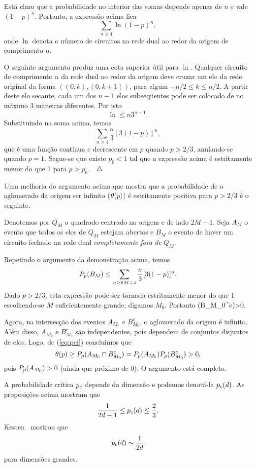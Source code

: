 Está claro que a probabilidade no interior das somas depende apenas de $n$ e vale
$(1-p)^n$. Portanto, a expressão acima fica
$$
\sum_{n\geq4}\ln(1-p)^n,
$$
onde $\ln$ denota o número de circuitos na rede dual ao redor da origem de 
comprimento $n$.

O seguinte argumento produz uma cota superior útil para $\ln$. Qualquer circuito
de comprimento $n$ da rede dual ao redor da origem deve cruzar um elo da rede
original da forma $((0,k),(0,k+1))$, para algum $-n/2\leq k\leq n/2$. A partir deste
elo secante, cada um dos $n-1$ elos subseqüentes pode ser colocado de no máximo 
$3$ maneiras diferentes. Por isto
$$\ln\leq n3^{n-1}.$$
Substituindo na soma acima, temos
$$
\sum_{n\geq4}\frac{n}{3}[3(1-p)]^n,
$$
que é uma função contínua e decrescente em $p$ quando $p>2/3$, anulando-se 
quando $p=1$. Segue-se que existe $p_0<1$ tal que a expressão acima é
estritamente menor do que 1 para $p>p_0$.$\quad\triangle$

\vs

Uma melhoria do argumento acima que mostra que a probabilidade de o aglomerado
da origem ser infinito ($\theta(p)$) é
estritamente positiva para $p>2/3$ é o seguinte.
   
Denotemos por $Q_M$ o quadrado centrado na origem e de lado $2M+1$.
Seja $A_M$ o evento que todos os elos de $Q_M$ estejam abertos e
$B_M$ o evento de haver um circuito fechado na rede dual {\em completamente
fora de} $Q_M$.

Repetindo o argumento da demonstração acima, temos
$$
P_p(B_M)\leq\sum_{n\geq 8M+4}\frac{n}{3}[3(1-p)]^n.  
$$
Dado $p>2/3$, esta expressão pode ser tornada estritamente menor do que 1 
escolhendo-se $M$ suficientemente grande, digamos $M_0$. Portanto
\beq\label{eq:pei}\p(B_{M_0}^c)>0.\eeq

Agora, na intersecção dos eventos $A_{M_0}$ e $B_{M_0}^c$, o aglomerado da origem é
infinito. Além disso, $A_{M_0}$ e $B_{M_0}^c$ são independentes, pois dependem de
conjuntos disjuntos de elos. Logo, de (\ref{eq:pei}) concluimos que
$$
\theta(p)\geq P_p(A_{M_0}\cap B_{M_0}^c)=P_p(A_{M_0})P_p(B_{M_0}^c)>0,
$$
pois $P_p(A_{M_0})>0$ (ainda que próximo de 0). O argumento está completo. 

\vs

A probabilidade crítica $p_c$ depende da dimensão e podemos denotá-la
$p_c(d)$. As proposições acima mostram que 
$$\frac{1}{2d-1}\leq p_c(d)\leq\frac{2}{3}.$$ Kesten~\cite{kn:K3} mostrou que
$$p_c(d)\sim\frac{1}{2d}$$ para dimensões grandes.

\vs

